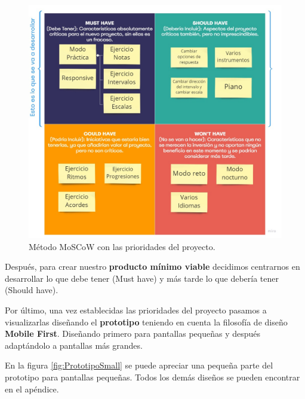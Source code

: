 \documentclass[12pt,twoside,titlepage]{report}
\begin{document}
\begin{figure}[H]
    \centering
    \includegraphics[scale=0.35]{Design Thinking/MosCow}
    \caption{Método MoSCoW con las prioridades del proyecto.}
    \label{fig:MoSCoW}
\end{figure}

Después, para crear nuestro \textbf{producto mínimo viable} decidimos centrarnos en desarrollar lo que debe tener (Must have) y más tarde lo que debería tener (Should have).

Por último, una vez establecidas las prioridades del proyecto pasamos a visualizarlas diseñando el \textbf{prototipo} teniendo en cuenta la filosofía de diseño \textbf{Mobile First}. Diseñando primero para pantallas pequeñas y después adaptándolo a pantallas más grandes. 

En la figura \ref{fig:PrototipoSmall} se puede apreciar una pequeña parte del prototipo para pantallas pequeñas. Todos los demás diseños se pueden encontrar en el apéndice.
    
\end{document}
